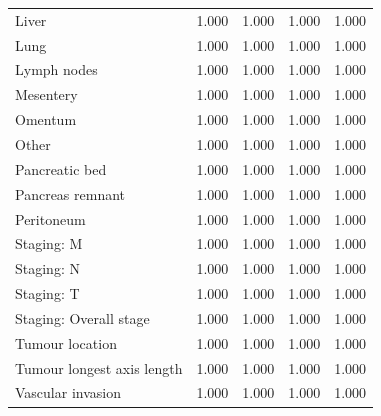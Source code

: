 \documentclass[dissertation.tex]{subfiles}
\begin{document}
\begin{table}[h]
\begin{tabular}{@{}lllll@{}}
\quad Liver                      & 1.000                         & 1.000 & 1.000                         & 1.000                         \\
\quad Lung                       & 1.000                         & 1.000 & 1.000                         & 1.000                         \\
\quad Lymph nodes                & 1.000                         & 1.000 & 1.000                         & 1.000                         \\
\quad Mesentery                  & 1.000                         & 1.000 & 1.000                         & 1.000                         \\
\quad Omentum                    & 1.000                         & 1.000 & 1.000                         & 1.000                         \\
\quad Other                      & 1.000                         & 1.000 & 1.000                         & 1.000                         \\
\quad Pancreatic bed             & 1.000                         & 1.000 & 1.000                         & 1.000                         \\
\quad Pancreas remnant           & 1.000                         & 1.000 & 1.000                         & 1.000                         \\
\quad Peritoneum                 & 1.000                         & 1.000 & 1.000                         & 1.000                         \\
Staging: M                 & 1.000                         & 1.000 & 1.000                         & 1.000                         \\
Staging: N                 & 1.000                         & 1.000 & 1.000                         & 1.000                         \\
Staging: T                 & 1.000                         & 1.000 & 1.000                         & 1.000                         \\
Staging: Overall stage     & 1.000                         & 1.000 & 1.000                         & 1.000                         \\
Tumour location            & 1.000                         & 1.000 & 1.000                         & 1.000                         \\
Tumour longest axis length & 1.000                         & 1.000 & 1.000                         & 1.000                         \\
Vascular invasion          & 1.000                         & 1.000 & 1.000                         & 1.000                         \\ \bottomrule
\end{tabular}
\end{table}
\end{document}
